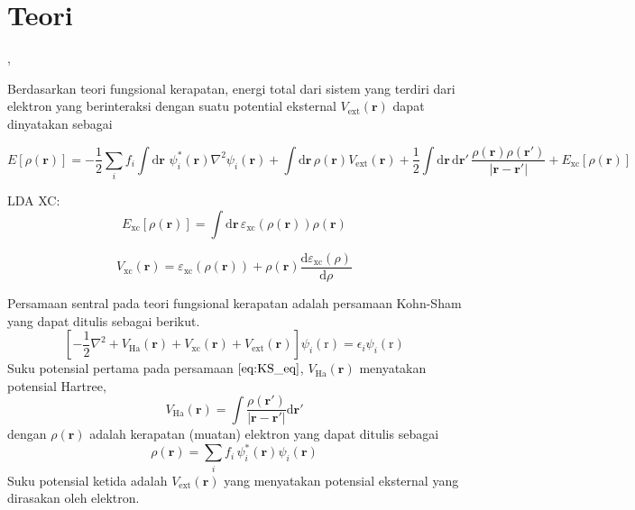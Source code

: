 \section{Teori}

\cite{Choi2015,Choi2016}, 

Berdasarkan teori fungsional kerapatan,
energi total dari sistem yang terdiri dari elektron yang berinteraksi
dengan suatu potential eksternal $V_{\mathrm{ext}}(\mathbf{r})$
dapat dinyatakan sebagai
\begin{widetext}
\begin{equation}
E[\rho(\mathbf{r})] = 
-\frac{1}{2}\sum_{i}f_{i}
\int\mathrm{d}\mathbf{r}\,
\, \psi^{*}_{i}(\mathbf{r}) \nabla^2 \psi_{i}(\mathbf{r})
+ \int\mathrm{d}\mathbf{r}\,
\rho(\mathbf{r}) V_{\mathrm{ext}}(\mathbf{r})
+
\frac{1}{2}\int\mathrm{d}\mathbf{r}\,\mathrm{d}\mathbf{r}'\,
\frac{\rho(\mathbf{r})\rho(\mathbf{r}')}{\left|\mathbf{r}-\mathbf{r}'\right|}
+ E_{\mathrm{xc}}[\rho(\mathbf{r})]
\end{equation}
\end{widetext}

LDA XC:
\begin{equation}
E_{\mathrm{xc}}[\rho(\mathbf{r})] =
\int\mathrm{d}\mathbf{r}\,
\varepsilon_{\mathrm{xc}}(\rho(\mathbf{r}))
\rho(\mathbf{r})
\end{equation}

\begin{equation}
V_{\mathrm{xc}}(\mathbf{r}) = \varepsilon_{\mathrm{xc}}(\rho(\mathbf{r}))
+ \rho(\mathbf{r})\frac{\mathrm{d}\varepsilon_{\mathrm{xc}}(\rho)}{\mathrm{d}\rho}
\end{equation}

Persamaan sentral pada teori fungsional kerapatan adalah persamaan
Kohn-Sham yang dapat ditulis sebagai berikut.
\begin{equation}
\left[
-\frac{1}{2}\nabla^2
+ V_{\mathrm{Ha}}(\mathbf{r})
+ V_{\mathrm{xc}}(\mathbf{r})
+ V_{\mathrm{ext}}(\mathbf{r})
\right]\psi_{i}(\mathrm{r}) =
\epsilon_{i} \psi_{i}(\mathrm{r})
\label{eq:KS_eq}
\end{equation}
Suku potensial pertama pada persamaan $\eqref{eq:KS_eq}$,
$V_{\mathrm{Ha}}(\mathbf{r})$ menyatakan potensial Hartree,
\begin{equation}
V_{\mathrm{Ha}}(\mathbf{r}) =
\int
\frac{\rho(\mathbf{r}')}{\left|\mathbf{r} - \mathbf{r}'\right|}
\mathrm{d}\mathbf{r}'
\end{equation}
dengan $\rho(\mathbf{r})$ adalah kerapatan (muatan) elektron
yang dapat ditulis sebagai
\begin{equation}
\rho(\mathbf{r}) = \sum_{i} f_{i}\, \psi^{*}_{i}(\mathbf{r}) \psi_{i}(\mathbf{r})
\end{equation}
Suku potensial ketida adalah $V_{\mathrm{ext}}(\mathbf{r})$
yang menyatakan potensial eksternal yang dirasakan oleh elektron.
